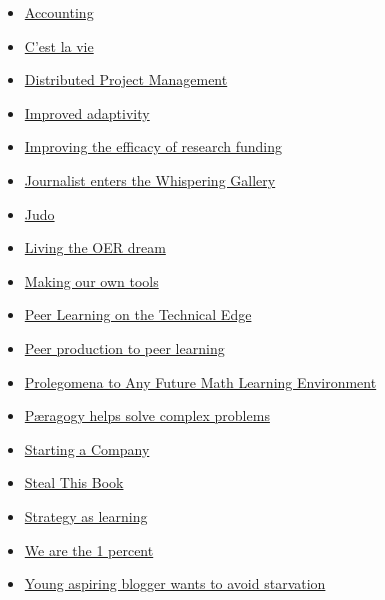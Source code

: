 \begin{itemize}
\item
  \href{http://peeragogy.org/accounting/}{Accounting}
\item
  \href{http://peeragogy.org/use-cases/cest-la-vie/}{C'est la vie}
\item
  \href{http://peeragogy.org/use-cases/distributed-project-management/}{Distributed
  Project Management}
\item
  \href{http://peeragogy.org/use-cases/improved-adaptivity/}{Improved
  adaptivity}
\item
  \href{http://peeragogy.org/use-cases/improving-the-efficacy-of-research-funding/}{Improving
  the efficacy of research funding}
\item
  \href{http://peeragogy.org/use-cases/journalist-enters-the-whispering-gallery/}{Journalist
  enters the Whispering Gallery}
\item
  \href{http://peeragogy.org/judo/}{Judo}
\item
  \href{http://peeragogy.org/use-cases/living-the-oer-dream/}{Living the
  OER dream}
\item
  \href{http://peeragogy.org/use-cases/making-our-own-tools/}{Making our
  own tools}
\item
  \href{http://peeragogy.org/use-cases/peer-learning-on-the-technical-edge/}{Peer
  Learning on the Technical Edge}
\item
  \href{http://peeragogy.org/use-cases/from-peer-production-to-peer-learning/}{Peer
  production to peer learning}
\item
  \href{http://peeragogy.org/use-cases/prolegomena-to-any-future-math-learning-environment/}{Prolegomena
  to Any Future Math Learning Environment}
\item
  \href{http://peeragogy.org/use-cases/paeragogy-helps-solve-complex-problems/}{Pæragogy
  helps solve complex problems}
\item
  \href{http://peeragogy.org/use-cases/starting-a-company/}{Starting a
  Company}
\item
  \href{http://peeragogy.org/use-cases/steal-this-book/}{Steal This
  Book}
\item
  \href{http://peeragogy.org/use-cases/strategy-as-learning/}{Strategy
  as learning}
\item
  \href{http://peeragogy.org/use-cases/we-are-the-1-percent/}{We are the
  1 percent}
\item
  \href{http://peeragogy.org/use-cases/young-aspiring-blogger-wants-to-avoid-starvation/}{Young
  aspiring blogger wants to avoid starvation}
\end{itemize}


